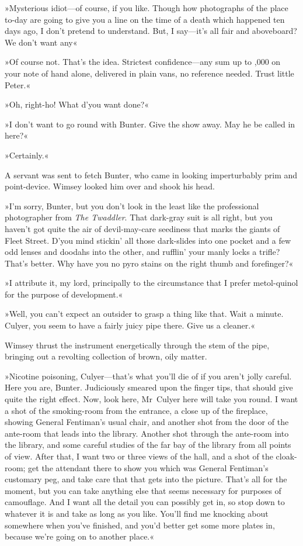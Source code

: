 »Mysterious idiot—of course, if you like. Though how photographs of the place to-day are going to give you a line on the time of a death which happened ten days ago, I don't pretend to understand. But, I say—it's all fair and aboveboard? We don't want any\longdash«

»Of course not. That's the idea. Strictest confidence—any sum up to ,000 on your note of hand alone, delivered in plain vans, no reference needed. Trust little Peter.«

»Oh, right-ho! What d'you want done?«

»I don't want to go round with Bunter. Give the show away. May he be called in here?«

»Certainly.«

A servant was sent to fetch Bunter, who came in looking imperturbably prim and point-device. Wimsey looked him over and shook his head.

»I'm sorry, Bunter, but you don't look in the least like the professional photographer from \textit{The Twaddler}. That dark-gray suit is all right, but you haven't got quite the air of devil-may-care seediness that marks the giants of Fleet Street. D'you mind stickin' all those dark-slides into one pocket and a few odd lenses and doodahs into the other, and rufflin' your manly locks a trifle? That's better. Why have you no pyro stains on the right thumb and forefinger?«

»I attribute it, my lord, principally to the circumstance that I prefer metol-quinol for the purpose of development.«

»Well, you can't expect an outsider to grasp a thing like that. Wait a minute. Culyer, you seem to have a fairly juicy pipe there. Give us a cleaner.«

Wimsey thrust the instrument energetically through the stem of the pipe, bringing out a revolting collection of brown, oily matter.

»Nicotine poisoning, Culyer—that's what you'll die of if you aren't jolly careful. Here you are, Bunter. Judiciously smeared upon the finger tips, that should give quite the right effect. Now, look here, Mr~Culyer here will take you round. I want a shot of the smoking-room from the entrance, a close up of the fireplace, showing General Fentiman's usual chair, and another shot from the door of the ante-room that leads into the library. Another shot through the ante-room into the library, and some careful studies of the far bay of the library from all points of view. After that, I want two or three views of the hall, and a shot of the cloak-room; get the attendant there to show you which was General Fentiman's customary peg, and take care that that gets into the picture. That's all for the moment, but you can take anything else that seems necessary for purposes of camouflage. And I want all the detail you can possibly get in, so stop down to whatever it is and take as long as you like. You'll find me knocking about somewhere when you've finished, and you'd better get some more plates in, because we're going on to another place.«

